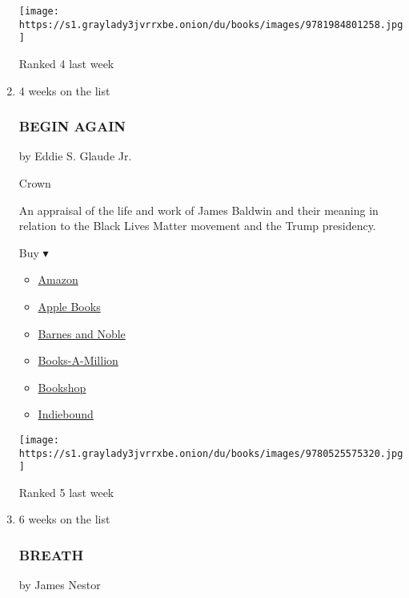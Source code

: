 \begin{enumerate}
  \texttt{[image: https://s1.graylady3jvrrxbe.onion/du/books/images/9781984801258.jpg]}

  Ranked 4 last week
\item
  4 weeks on the list

  \hypertarget{begin-again}{%
  \subsubsection{BEGIN AGAIN}\label{begin-again}}

  by Eddie S. Glaude Jr.

  Crown

  An appraisal of the life and work of James Baldwin and their meaning
  in relation to the Black Lives Matter movement and the Trump
  presidency.

  Buy ▾

  \begin{itemize}
  \tightlist
  \item
    \href{https://www.amazon.com/dp/0525575324?tag=NYTBSREV-20\&tag=NYTBS-20}{Amazon}
  \item
    \href{https://du-gae-books-dot-nyt-du-prd.appspot.com/buy?title=BEGIN+AGAIN\&author=Eddie+S+Glaude+Jr}{Apple
    Books}
  \item
    \href{https://www.anrdoezrs.net/click-7990613-11819508?url=https\%3A\%2F\%2Fwww.barnesandnoble.com\%2Fw\%2F\%3Fean\%3D9780525575320}{Barnes
    and Noble}
  \item
    \href{https://www.anrdoezrs.net/click-7990613-35140?url=https\%3A\%2F\%2Fwww.booksamillion.com\%2Fp\%2FBEGIN\%2BAGAIN\%2FEddie\%2BS\%2BGlaude\%2BJr\%2F9780525575320}{Books-A-Million}
  \item
    \href{https://bookshop.org/a/3546/9780525575320}{Bookshop}
  \item
    \href{https://www.indiebound.org/book/9780525575320?aff=NYT}{Indiebound}
  \end{itemize}

  \texttt{[image: https://s1.graylady3jvrrxbe.onion/du/books/images/9780525575320.jpg]}

  Ranked 5 last week
\item
  6 weeks on the list

  \hypertarget{breath}{%
  \subsubsection{BREATH}\label{breath}}

  by James Nestor


\end{enumerate}
